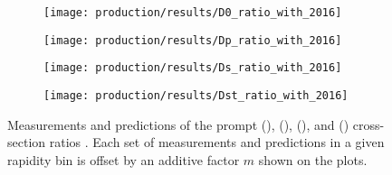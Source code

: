 \begin{figure}
  \begin{subfigure}[b]{0.5\textwidth}
    \centering
    \texttt{[image: production/results/D0\_ratio\_with\_2016]}
    \caption{\PDzero}
    \label{fig:prod:results:ratio_5tev:D0}
  \end{subfigure}
  \begin{subfigure}[b]{0.5\textwidth}
    \centering
    \texttt{[image: production/results/Dp\_ratio\_with\_2016]}
    \caption{\PDplus}
    \label{fig:prod:results:ratio_5tev:Dp}
  \end{subfigure}
  \begin{subfigure}[b]{0.5\textwidth}
    \centering
    \texttt{[image: production/results/Ds\_ratio\_with\_2016]}
    \caption{\PDsplus}
    \label{fig:prod:results:ratio_5tev:Ds}
  \end{subfigure}
  \begin{subfigure}[b]{0.5\textwidth}
    \centering
    \texttt{[image: production/results/Dst\_ratio\_with\_2016]}
    \caption{\PDstarp}
    \label{fig:prod:results:ratio_5tev:Dst}
  \end{subfigure}
  \caption{%
    Measurements and predictions of the prompt \PDzero
    (), \PDplus
    (), \PDsplus
    (), and \PDstarp
    () cross-section ratios
    .
    Each set of measurements and predictions in a given rapidity bin is offset
    by an additive factor $m$ shown on the plots.
  }
  \label{fig:prod:results:ratio_5tev}
\end{figure}
